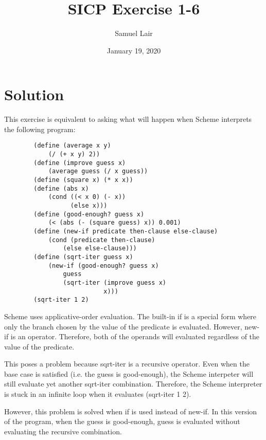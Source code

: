 \documentclass{article}
\title{SICP Exercise 1-6}
\author{Samuel Lair}
\date{January 19, 2020}
\begin{document}
\maketitle

\section{Solution}

This exercise is equivalent to asking what will happen when Scheme interprets the following program:

\begin{verbatim}
        (define (average x y)
            (/ (+ x y) 2))
        (define (improve guess x)
            (average guess (/ x guess))
        (define (square x) (* x x))
        (define (abs x)
            (cond ((< x 0) (- x))
                  (else x)))
        (define (good-enough? guess x)
            (< (abs (- (square guess) x)) 0.001)
        (define (new-if predicate then-clause else-clause)
            (cond (predicate then-clause)
                (else else-clause)))
        (define (sqrt-iter guess x)
            (new-if (good-enough? guess x)
                guess
                (sqrt-iter (improve guess x)
                           x)))
        (sqrt-iter 1 2)
\end{verbatim}

Scheme uses applicative-order evaluation.  The built-in if is a special form where only the branch chosen by the value of the predicate is evaluated.  However, new-if is an operator.  Therefore, both of the operands will evaluated regardless of the value of the predicate.

This poses a problem because sqrt-iter is a recursive operator.  Even when the base case is satisfied (i.e. the guess is good-enough), the Scheme interpeter will still evaluate yet another sqrt-iter combination.  Therefore, the Scheme interpreter is stuck in an infinite loop when it evaluates (sqrt-iter 1 2). 

However, this problem is solved when if is used instead of new-if.  In this version of the program, when the guess is good-enough, guess is evaluated without evaluating the recursive combination.
\end{document}
